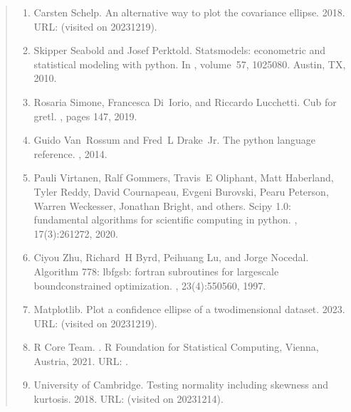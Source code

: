 \documentclass[letterpaper,10pt,english]{sphinxmanual}
\begin{document}
\begin{quote}
\begin{enumerate}
\item {} 
\sphinxAtStartPar
Carsten Schelp. An alternative way to plot the covariance ellipse. 2018. URL:  (visited on 2023\sphinxhyphen{}12\sphinxhyphen{}19).

\item {} 
\sphinxAtStartPar
Skipper Seabold and Josef Perktold. Statsmodels: econometric and statistical modeling with python. In , volume 57, 10\textendash{}25080. Austin, TX, 2010.

\item {} 
\sphinxAtStartPar
Rosaria Simone, Francesca Di Iorio, and Riccardo Lucchetti. Cub for gretl. , pages 147, 2019.

\item {} 
\sphinxAtStartPar
Guido Van Rossum and Fred L Drake Jr. The python language reference. , 2014.

\item {} 
\sphinxAtStartPar
Pauli Virtanen, Ralf Gommers, Travis E Oliphant, Matt Haberland, Tyler Reddy, David Cournapeau, Evgeni Burovski, Pearu Peterson, Warren Weckesser, Jonathan Bright, and others. Scipy 1.0: fundamental algorithms for scientific computing in python. , 17(3):261\textendash{}272, 2020.

\item {} 
\sphinxAtStartPar
Ciyou Zhu, Richard H Byrd, Peihuang Lu, and Jorge Nocedal. Algorithm 778: l\sphinxhyphen{}bfgs\sphinxhyphen{}b: fortran subroutines for large\sphinxhyphen{}scale bound\sphinxhyphen{}constrained optimization. , 23(4):550\textendash{}560, 1997.

\item {} 
\sphinxAtStartPar
Matplotlib. Plot a confidence ellipse of a two\sphinxhyphen{}dimensional dataset. 2023. URL:  (visited on 2023\sphinxhyphen{}12\sphinxhyphen{}19).

\item {} 
\sphinxAtStartPar
R Core Team. . R Foundation for Statistical Computing, Vienna, Austria, 2021. URL: .

\item {} 
\sphinxAtStartPar
University of Cambridge. Testing normality including skewness and kurtosis. 2018. URL:  (visited on 2023\sphinxhyphen{}12\sphinxhyphen{}14).

\end{enumerate}
\end{quote}
\end{document}
